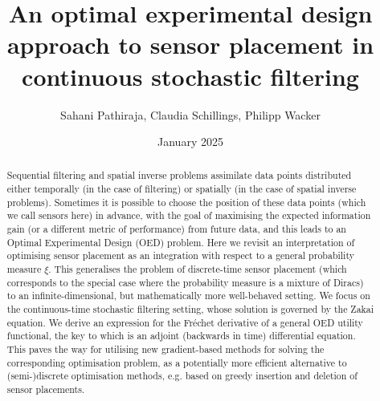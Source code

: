 \documentclass[10pt]{article}
\title{An optimal experimental design approach to sensor placement in continuous stochastic filtering}
\author{Sahani Pathiraja, Claudia Schillings, Philipp Wacker}
\date{January 2025}
\numberwithin{equation}{section}
\numberwithin{figure}{section}
\theoremstyle{remark}
\begin{document}
\maketitle


\begin{abstract}
    Sequential filtering and spatial inverse problems assimilate data points distributed either temporally (in the case of filtering) or spatially (in the case of spatial inverse problems). Sometimes it is possible to choose the position of these data points (which we call sensors here) in advance, with the goal of maximising the expected information gain (or a different metric of performance) from future data, and this leads to an Optimal Experimental Design (OED) problem. Here we revisit an interpretation of optimising sensor placement as an integration with respect to a general probability measure $\xi$. This generalises the problem of discrete-time sensor placement (which corresponds to the special case where the probability measure is a mixture of Diracs)  to an infinite-dimensional, but mathematically more well-behaved setting. We focus on the continuous-time stochastic filtering setting, whose solution is governed by the Zakai equation.  We derive an expression for the Fr\'echet derivative of a general OED utility functional, the key to which is an adjoint (backwards in time) differential equation. This paves the way for utilising new gradient-based methods for solving the corresponding optimisation problem, as a potentially more efficient alternative to (semi-)discrete optimisation methods, e.g. based on greedy insertion and deletion of sensor placements.
\end{abstract}

\tableofcontents
\end{document}
